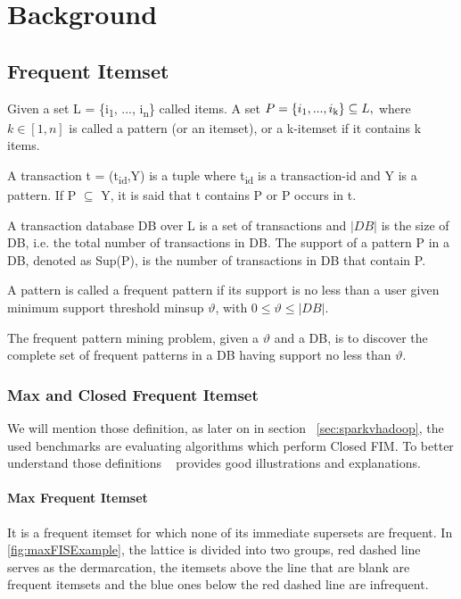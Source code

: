 \section{Background}
\subsection{Frequent Itemset}
Given a set L = \{i\textsubscript{1}, ..., i\textsubscript{n}\} called items. 
A set $P=\{i\textsubscript{1},...,i\textsubscript{k}\} \subseteq L,$ where $k \in [1,n] $ is called a pattern (or an itemset), or a k-itemset if it contains k items. 

A transaction t = (t\textsubscript{id},Y) is a tuple where t\textsubscript{id} is a transaction-id and Y is a pattern. If P $\subseteq  $ Y, it is said that t contains P or P occurs in t. 

A transaction database DB over L is a set of transactions and $|DB|$ is the size of DB, i.e. the total number of transactions in DB. The support of a pattern P in a DB, denoted as Sup(P), is the number of transactions in DB that contain P. 

A pattern is called a frequent pattern if its support is no less than a user given minimum support threshold minsup $ \vartheta $, with $ 0 \leq \vartheta \leq |DB|$. 

The frequent pattern mining problem, given a $ \vartheta $ and a DB, is to discover the complete set of frequent patterns in a DB having support no less than $ \vartheta $. 

\subsubsection{Max and Closed Frequent Itemset}
We will mention those definition, as later on in section ~\ref{sec:sparkvhadoop}, the used benchmarks are evaluating algorithms which perform Closed FIM. To better understand those definitions ~\cite{dataminingbook} provides good illustrations and explanations.

\paragraph{Max Frequent Itemset}
It is a frequent itemset for which none of its immediate supersets are frequent. In \ref{fig:maxFISExample}, the lattice is divided into two groups, red dashed line serves as the dermarcation, the itemsets above the line that are blank are frequent itemsets and the blue ones below the red dashed line are infrequent.

